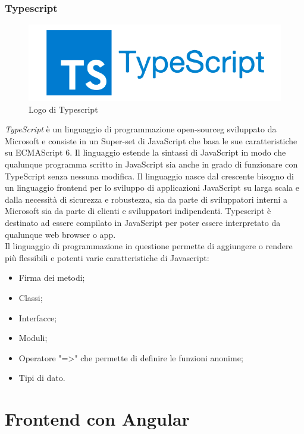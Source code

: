 \subsubsection*{Typescript}
\begin{figure}[!h] 
    \centering 
    \includegraphics[width=0.6\columnwidth]{immagini/cap4/Typescript_logo_2.png} 
    \caption{Logo di Typescript}
\end{figure}
\noindent \textit{TypeScript} è un linguaggio di programmazione \gls{open-sourceg} sviluppato da Microsoft e consiste in un Super-set di JavaScript che basa le sue caratteristiche su ECMAScript 6. Il linguaggio estende la sintassi di JavaScript in modo che qualunque programma scritto in JavaScript sia anche in grado di funzionare con TypeScript senza nessuna modifica. Il linguaggio  nasce dal crescente bisogno di un linguaggio frontend per lo sviluppo di applicazioni JavaScript su larga scala e dalla necessità di sicurezza e robustezza, sia da parte di sviluppatori interni a Microsoft sia da parte di clienti e sviluppatori indipendenti. Typescript è destinato ad essere compilato in JavaScript per poter essere interpretato da qualunque web browser o app. \\
Il linguaggio di programmazione in questione permette di aggiungere o rendere più flessibili e potenti varie caratteristiche di Javascript:
\begin{itemize}
    \item Firma dei metodi;
    \item Classi;
    \item Interfacce;
    \item Moduli;
    \item Operatore "=>" che permette di definire le funzioni anonime;
    \item Tipi di dato.
\end{itemize}


\section{Frontend con Angular}

